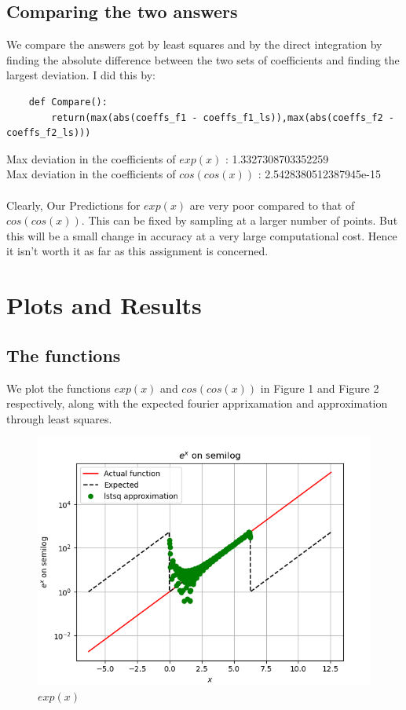 \documentclass[11pt, a4paper]{article}
\begin{document}
    \subsection{Comparing the two answers}
    We compare the answers got by least squares and by the direct integration by finding the absolute difference between the two sets of coefficients and finding the largest deviation. I did this by:
    \begin{verbatim}
    def Compare():
        return(max(abs(coeffs_f1 - coeffs_f1_ls)),max(abs(coeffs_f2 - coeffs_f2_ls)))
    \end{verbatim}
    Max deviation in the coefficients of $exp(x)$ : 1.3327308703352259\\
    Max deviation in the coefficients of $cos(cos(x))$ : 2.5428380512387945e-15
    \\\\
    Clearly, Our Predictions for $exp(x)$ are very poor compared to that of $cos(cos(x))$. This can be fixed by sampling at a larger number of points.  But this will be a small change in accuracy at a very large computational cost. Hence it isn't worth it as far as this assignment is concerned.
\section{Plots and Results}
    \subsection{The functions}
    We plot the functions $exp(x)$ and $cos(cos(x))$ in Figure 1 and Figure 2 respectively, along with the expected fourier apprixamation and approximation through least squares.
    \begin{figure}[!h]
        \centering
        \includegraphics[scale = 0.7]{Figure 1.png}
        \caption{$exp(x)$}
        \label{fig:Figure 1}
    \end{figure}
    
\end{document}
